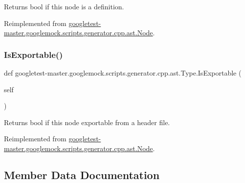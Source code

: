\begin{DoxyVerb}Returns bool if this node is a definition.\end{DoxyVerb}
 

Reimplemented from \mbox{\hyperlink{classgoogletest-master_1_1googlemock_1_1scripts_1_1generator_1_1cpp_1_1ast_1_1_node_a3a3edec9cd30222cfea1295005abadd3}{googletest-\/master.\+googlemock.\+scripts.\+generator.\+cpp.\+ast.\+Node}}.

\mbox{\label{classgoogletest-master_1_1googlemock_1_1scripts_1_1generator_1_1cpp_1_1ast_1_1_type_a964085017b8352d9dfe441d1608ee5f4}} 
\subsubsection{\texorpdfstring{IsExportable()}{IsExportable()}}
{\footnotesize\ttfamily def googletest-\/master.\+googlemock.\+scripts.\+generator.\+cpp.\+ast.\+Type.\+Is\+Exportable (\begin{DoxyParamCaption}\item[{}]{self }\end{DoxyParamCaption})}

\begin{DoxyVerb}Returns bool if this node exportable from a header file.\end{DoxyVerb}
 

Reimplemented from \mbox{\hyperlink{classgoogletest-master_1_1googlemock_1_1scripts_1_1generator_1_1cpp_1_1ast_1_1_node_a84e05fc36f3b1f650b0aad690ef91c3a}{googletest-\/master.\+googlemock.\+scripts.\+generator.\+cpp.\+ast.\+Node}}.



\subsection{Member Data Documentation}
\mbox{\label{classgoogletest-master_1_1googlemock_1_1scripts_1_1generator_1_1cpp_1_1ast_1_1_type_aefefd9749448a638c075150028f7e3bf}} 
